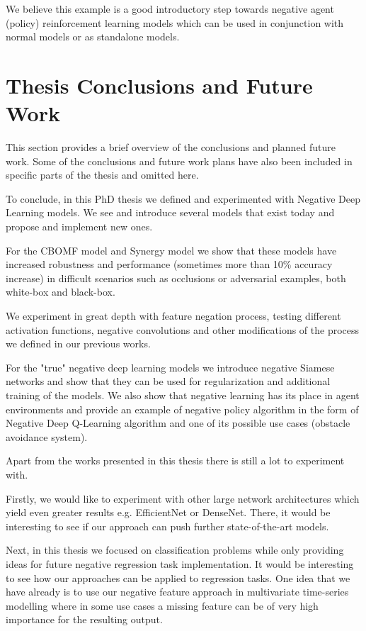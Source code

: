 \documentclass[b5paper]{book}
\begin{document}
We believe this example is a good introductory step towards negative agent (policy) reinforcement learning models which can be used in conjunction with normal models or as standalone models. 

\chapter{Thesis Conclusions and Future Work}

This section provides a brief overview of the conclusions and planned future work. Some of the conclusions and future work plans have also been included in specific parts of the thesis and omitted here.

To conclude, in this PhD thesis we defined and experimented with Negative Deep Learning models. We see and introduce several models that exist today and propose and implement new ones.

For the CBOMF model and Synergy model we show that these models have increased robustness and performance (sometimes more than 10\% accuracy increase) in difficult scenarios such as occlusions or adversarial examples, both white-box and black-box.

We experiment in great depth with feature negation process, testing different activation functions, negative convolutions and other modifications of the process we defined in our previous works.

For the "true" negative deep learning models we introduce negative Siamese networks and show that they can be used for regularization and additional training of the models. We also show that negative learning has its place in agent environments and provide an example of negative policy algorithm in the form of Negative Deep Q-Learning algorithm and one of its possible use cases (obstacle avoidance system).

Apart from the works presented in this thesis there is still a lot to experiment with. 

Firstly, we would like to experiment with other large network architectures which yield even greater results e.g. EfficientNet or DenseNet. There, it would be interesting to see if our approach can push further state-of-the-art models.

Next, in this thesis we focused on classification problems while only providing ideas for future negative regression task implementation. It would be interesting to see how our approaches can be applied to regression tasks. One idea that we have already is to use our negative feature approach in multivariate time-series modelling where in some use cases a missing feature can be of very high importance for the resulting output.
\end{document}
